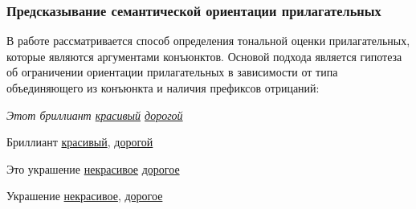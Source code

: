         \subsubsection{Предсказывание семантической ориентации прилагательных}
        \label{sec:adjectivesPrediction}
        В работе \cite{lexiconAdjectives} рассматривается способ определения
        тональной оценки прилагательных, которые являются аргументами конъюнктов.
        Основой подхода является гипотеза об ограничении ориентации прилагательных
        в зависимости от типа объединяющего из конъюнкта и наличия префиксов отрицаний:
        \begin{center}
            \it
            Этот бриллиант \underline{красивый} {} \underline{дорогой}

            Бриллиант \underline{красивый}, {} \underline{дорогой}

            Это украшение \underline{некрасивое} {} \underline{дорогое}

            Украшение \underline{некрасивое}, {} \underline{дорогое}
        \end{center}

